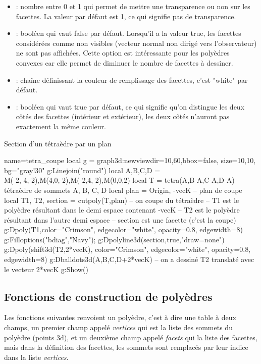 \begin{itemize}
        \item {} : nombre entre 0 et 1 qui permet de mettre une transparence ou non sur les facettes. La valeur par défaut est 1, ce qui signifie pas de transparence.
        \item {} : booléen qui vaut false par défaut. Lorsqu'il a la valeur true, les facettes considérées comme non visibles (vecteur normal non dirigé vers l'observateur) ne sont pas affichées. Cette option est intéressante pour les polyèdres convexes car elle permet de diminuer le nombre de facettes à dessiner.
        \item {} : chaîne définissant la couleur de remplissage des facettes, c'est "white" par défaut.
        \item {} : booléen qui vaut true par défaut, ce qui signifie qu'on distingue les deux côtés des facettes (intérieur et extérieur), les deux côtés n'auront pas exactement la même couleur.
\end{itemize}

\begin{demo}{Section d'un tétraèdre par un plan}
\begin{luadraw}{name=tetra_coupe}
local g = graph3d:new{viewdir={10,60},bbox=false, size={10,10}, bg="gray!30"}
g:Linejoin("round")
local A,B,C,D = M(-2,-4,-2),M(4,0,-2),M(-2,4,-2),M(0,0,2)
local T = tetra(A,B-A,C-A,D-A) -- tétraèdre de sommets A, B, C, D
local plan = {Origin, -vecK}  -- plan de coupe
local T1, T2, section = cutpoly(T,plan) -- on coupe du tétraèdre
-- T1 est le polyèdre résultant dans le demi espace contenant -vecK
-- T2 est le polyèdre résultant dans l'autre demi espace
-- section est une facette (c'est la coupe)
g:Dpoly(T1,{color="Crimson", edgecolor="white", opacity=0.8, edgewidth=8})
g:Filloptions("bdiag","Navy"); g:Dpolyline3d(section,true,"draw=none")
g:Dpoly(shift3d(T2,2*vecK), {color="Crimson", edgecolor="white", opacity=0.8, edgewidth=8})
g:Dballdots3d({A,B,C,D+2*vecK}) -- on a dessiné T2 translaté avec le vecteur 2*vecK
g:Show()
\end{luadraw}
\end{demo}

\subsection{Fonctions de construction de polyèdres}

Les fonctions suivantes renvoient un polyèdre, c'est à dire une table à deux champs, un premier champ appelé \emph{vertices} qui est la liste des sommets du polyèdre (points 3d), et un deuxième champ appelé \emph{facets} qui la liste des facettes, mais dans la définition des facettes, les sommets sont remplacés par leur indice dans la liste \emph{vertices}.

